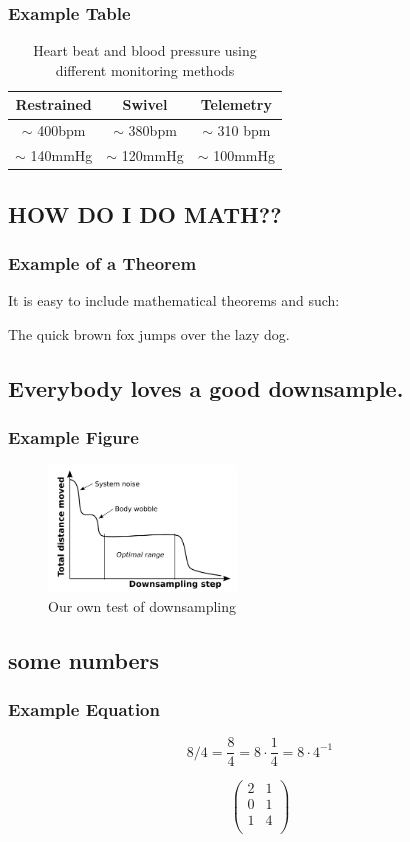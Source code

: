 \documentclass{beamer}
\begin{document}
\frame
{
	\frametitle{Example Table}
	
	\begin{table}
	\centering
	\begin{tabular}{|c|c|c|} \hline \hline
	Restrained     & Swivel         & Telemetry      \\ \hline \hline
	$\sim$ 400bpm  & $\sim$ 380bpm  & $\sim$ 310 bpm \\
	$\sim$ 140mmHg & $\sim$ 120mmHg & $\sim$ 100mmHg \\ \hline \hline
	\end{tabular}
	\caption{Heart beat and blood pressure using different monitoring methods}
	\label{tbl:kramer}
	\end{table}
}

\subsection{HOW DO I DO MATH??}
\frame
{
	\frametitle{Example of a Theorem}
	It is easy to include mathematical theorems and such:
	\begin{theorem}
	The quick brown fox jumps over the lazy dog.
	\end{theorem}
}


\subsection{Everybody loves a good downsample.}
\frame
{
	\frametitle{Example Figure}
	
	\begin{figure}
	\centering
	\includegraphics[width=5cm]{sample_rate.png}
	\caption{Our own test of downsampling}
	\label{fig:test_down_sampling}
	\end{figure}
}

\subsection{some numbers}
\frame
{
	\frametitle{Example Equation}

	\[8 / 4 = \frac{8}{4} = 8 \cdot \frac{1}{4} = 8 \cdot 4^{-1}\]
	
	\[\left( \begin{array}{cc}
	2 & 1 \\
	0 & 1 \\
	1 & 4 \\
	\end{array} \right)\]
}
\end{document}
